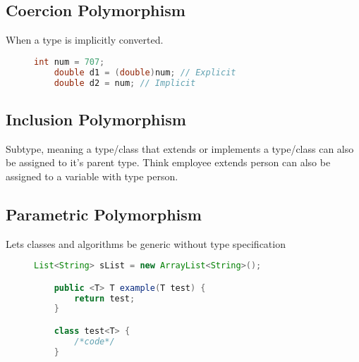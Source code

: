 \subsection*{Coercion Polymorphism}
When a type is implicitly converted.
\begin{figure}[h!]
    \begin{lstlisting}[language=Java]
    int num = 707;
    double d1 = (double)num; // Explicit
    double d2 = num; // Implicit
    \end{lstlisting}
\end{figure}

\subsection*{Inclusion Polymorphism}
Subtype, meaning a type/class that extends or implements a type/class can also be assigned to it's parent type. Think employee extends person can also be assigned to a variable with type person.
\clearpage
\subsection*{Parametric Polymorphism}
Lets classes and algorithms be generic without type specification
\begin{figure}[h!]
    \begin{lstlisting}[language=Java]
    List<String> sList = new ArrayList<String>();

    public <T> T example(T test) {
        return test;
    }

    class test<T> {
        /*code*/
    }
    \end{lstlisting}
\end{figure}
